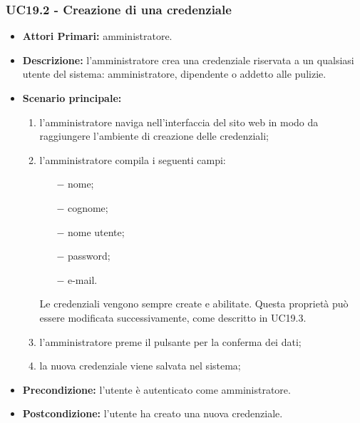 \subsubsection{ UC19.2 - Creazione di una credenziale}
\begin{itemize}
	\item\textbf{Attori Primari:}
	amministratore.
	\item\textbf{Descrizione:} 
	l'amministratore crea una credenziale riservata a un qualsiasi utente del sistema: amministratore, dipendente o addetto alle pulizie.
	\item\textbf{Scenario principale:} 
	\begin{enumerate}
		\item l'amministratore naviga nell'interfaccia del sito web in modo da raggiungere l'ambiente di creazione delle credenziali;
		\item l'amministratore compila i seguenti campi:
		\begin{itemize}
			\item[$-$] nome;
			\item[$-$] cognome;
			\item[$-$] nome utente;
			\item[$-$] password;
			\item[$-$] e-mail.
		\end{itemize}
		Le credenziali vengono sempre create e abilitate. Questa proprietà può essere modificata successivamente, come descritto in UC19.3.
		\item l'amministratore preme il pulsante per la conferma dei dati;
		\item la nuova credenziale viene salvata nel sistema;
	\end{enumerate}
	\item\textbf{Precondizione:} 
	l'utente è autenticato come amministratore.
	\item\textbf{Postcondizione:}
	l'utente ha creato una nuova credenziale.
\end{itemize}

